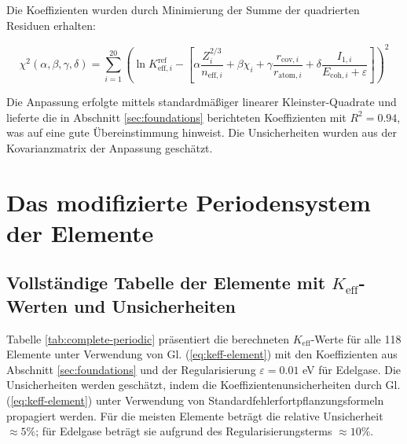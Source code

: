 \documentclass[12pt,a4paper]{article}
\newcommand{\Keff}{K_{\mathrm{eff}}}
\begin{document}
	Die Koeffizienten wurden durch Minimierung der Summe der quadrierten Residuen erhalten:
	
	\begin{equation}
		\chi^2(\alpha,\beta,\gamma,\delta) = \sum_{i=1}^{20} \left( \ln K_{\mathrm{eff},i}^{\text{ref}} - \left[ \alpha \frac{Z_i^{2/3}}{n_{\text{eff},i}} + \beta \chi_i + \gamma \frac{r_{\text{cov},i}}{r_{\text{atom},i}} + \delta \frac{I_{1,i}}{E_{\text{coh},i} + \varepsilon} \right] \right)^2
		\label{eq:chi2}
	\end{equation}
	
	Die Anpassung erfolgte mittels standardmäßiger linearer Kleinster-Quadrate und lieferte die in Abschnitt \ref{sec:foundations} berichteten Koeffizienten mit $R^2 = 0.94$, was auf eine gute Übereinstimmung hinweist. Die Unsicherheiten wurden aus der Kovarianzmatrix der Anpassung geschätzt.
	
	\section{Das modifizierte Periodensystem der Elemente}
	\label{sec:periodic-table}
	
	\subsection{Vollständige Tabelle der Elemente mit $\Keff$-Werten und Unsicherheiten}
	
	Tabelle \ref{tab:complete-periodic} präsentiert die berechneten $\Keff$-Werte für alle 118 Elemente unter Verwendung von Gl. (\ref{eq:keff-element}) mit den Koeffizienten aus Abschnitt \ref{sec:foundations} und der Regularisierung $\varepsilon = 0.01$ eV für Edelgase. Die Unsicherheiten werden geschätzt, indem die Koeffizientenunsicherheiten durch Gl. (\ref{eq:keff-element}) unter Verwendung von Standardfehlerfortpflanzungsformeln propagiert werden. Für die meisten Elemente beträgt die relative Unsicherheit $\approx 5\%$; für Edelgase beträgt sie aufgrund des Regularisierungsterms $\approx 10\%$.
	
\end{document}
